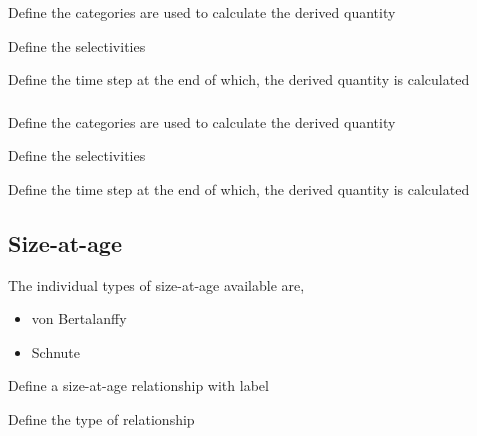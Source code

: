  {Define the categories are used to calculate the derived quantity}

 {Define the selectivities}

 {Define the time step at the end of which, the derived quantity is calculated}

\subsubsection[Biomass]{}

 {Define the categories are used to calculate the derived quantity}

 {Define the selectivities}

 {Define the time step at the end of which, the derived quantity is calculated}

\subsection{Size-at-age}

The individual types of size-at-age available are, 

\begin{itemize}
	\item von Bertalanffy
	\item Schnute
\end{itemize}

 {Define a size-at-age relationship with label}

 {Define the type of relationship}

\subsubsection[von Bertalanffy]{}


